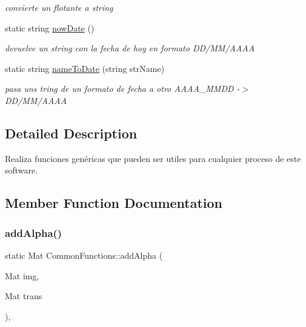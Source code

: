 \begin{DoxyCompactItemize}
\begin{DoxyCompactList}\small\item\em convierte un flotante a string \end{DoxyCompactList}\item 
static string \mbox{\hyperlink{classCommonFunctions_aa8211622807d5dc2721a9c8fe834da79}{now\+Date}} ()
\begin{DoxyCompactList}\small\item\em devuelve un string con la fecha de hoy en formato D\+D/\+M\+M/\+A\+A\+AA \end{DoxyCompactList}\item 
static string \mbox{\hyperlink{classCommonFunctions_a91cd4c4a5cf95a892dd9e117e709b810}{name\+To\+Date}} (string str\+Name)
\begin{DoxyCompactList}\small\item\em pasa uns tring de un formato de fecha a otro A\+A\+A\+A\+\_\+\+M\+M\+DD -\/$>$ D\+D/\+M\+M/\+A\+A\+AA \end{DoxyCompactList}\end{DoxyCompactItemize}


\subsection{Detailed Description}
Realiza funciones genéricas que pueden ser utiles para cualquier proceso de este software. 

\subsection{Member Function Documentation}
\mbox{\label{classCommonFunctions_acede9b6245c18d795b94b7c2261671b1}} 
\subsubsection{\texorpdfstring{add\+Alpha()}{addAlpha()}}
{\footnotesize\ttfamily static Mat Common\+Functions\+::add\+Alpha (\begin{DoxyParamCaption}\item[{Mat}]{img,  }\item[{Mat}]{trans }\end{DoxyParamCaption})\hspace{0.3cm}{\ttfamily [inline]}, {\ttfamily [static]}}



